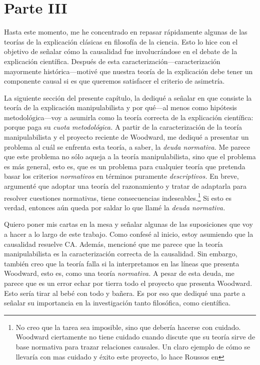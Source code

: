 \section{Parte III}\label{s:piii}


\noindent Hasta este momento, me he concentrado en repasar
rápidamente algunas de las teorías de la explicación
clásicas en filosofía de la ciencia. Esto lo hice con el
objetivo de señalar cómo la causalidad fue involucrándose en
el debate de la explicación científica. Después de esta
caracterización---caracterización mayormente
histórica---motivé que nuestra teoría de la explicación
debe tener un componente causal si es que queremos
satisfacer el criterio de asimetría.

La siguiente sección del presente capítulo, la dediqué a
señalar en que consiste la teoría de la explicación
manipulabilista y por qué---al menos como hipótesis
metodológica---voy a asumirla como la teoría correcta de
la explicación científica: porque paga su \emph{cuota
metodológica.} A partir de la caracterización de la teoría
manipulabilista y el proyecto reciente de Woodward, me
dediqué a presentar un problema al cuál se enfrenta esta
teoría, a saber, la \emph{deuda normativa.} Me parece que
este problema no sólo aqueja a la teoría manipulabilista,
sino que el problema es más general, esto es, que es un
problema para cualquier teoría que pretenda basar los
criterios \emph{normativos} en términos puramente
\emph{descriptivos.} En breve, argumenté que adoptar una
teoría del razonamiento y tratar de adaptarla para resolver
cuestiones normativas, tiene consecuencias
indeseables.\footnote{
  No creo que la tarea sea imposible, sino que debería
  hacerse con cuidado. Woodward ciertamente no
  tiene cuidado cuando discute que su teoría sirve de base
  normativa para trazar relaciones causales. Un claro
  ejemplo de cómo se llevaría con mas cuidado y éxito este
  proyecto, lo hace Roussos en 
}
Si esto es verdad, entonces aún queda por saldar lo que llamé
la \emph{deuda normativa.} 

Quiero poner mis cartas en la mesa y señalar algunas de las
suposiciones que voy a hacer a lo largo de este trabajo.
Como confesé al inicio, estoy asumiendo que la causalidad
resuelve CA. Además, mencioné que me parece que la teoría
manipulabilista es la caracterización correcta de la
causalidad. Sin embargo, también creo que la teoría falla si
la interpretamos en las líneas que presenta Woodward, esto
es, como una teoría \emph{normativa.} A pesar de esta deuda,
me parece que es un error echar por tierra todo el proyecto
que presenta Woodward. Esto sería tirar al bebé con todo y
bañera. Es por eso que dediqué una parte a señalar su
importancia en la investigación tanto filosófica, como
científica. 

